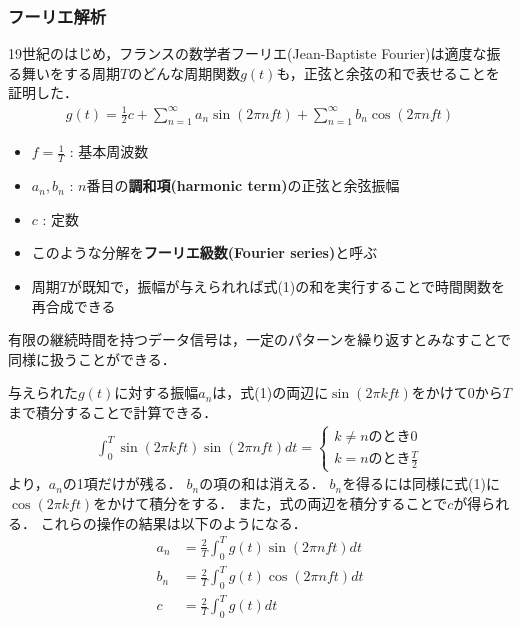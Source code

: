 \documentclass[a4paper]{ltjsarticle}
\begin{document}
		\subsubsection{フーリエ解析}
			19世紀のはじめ，フランスの数学者フーリエ(Jean-Baptiste Fourier)は適度な振る舞いをする周期$T$のどんな周期関数$g(t)$も，正弦と余弦の和で表せることを証明した．
			\begin{align}
				g(t) = \frac{1}{2}c + \sum^{\infty}_{n=1} a_n \sin(2\pi nft) + \sum^{\infty}_{n=1} b_n \cos(2\pi nft)
			\end{align}
			\begin{itemize}
				\item $f=\frac{1}{T}$ : 基本周波数
				\item $a_n,b_n$ : $n$番目の\textbf{調和項(harmonic term)}の正弦と余弦振幅
				\item $c$ : 定数
				\item このような分解を\textbf{フーリエ級数(Fourier series)}と呼ぶ
				\item 周期$T$が既知で，振幅が与えられれば式(1)の和を実行することで時間関数を再合成できる
			\end{itemize}
			有限の継続時間を持つデータ信号は，一定のパターンを繰り返すとみなすことで同様に扱うことができる．\par
			与えられた$g(t)$に対する振幅$a_n$は，式(1)の両辺に$\sin(2\pi kft)$をかけて$0$から$T$まで積分することで計算できる．
			\begin{align}
				\int^T_0 \sin(2\pi kft) \sin(2\pi nft) dt =
				\begin{cases}
					k \neq n \text{のとき} 0 \\
					k = n \text{のとき} \frac{T}{2}
				\end{cases}
			\end{align}
			より，$a_n$の1項だけが残る．
			$b_n$の項の和は消える．
			$b_n$を得るには同様に式(1)に$\cos(2\pi kft)$をかけて積分をする．
			また，式の両辺を積分することで$c$が得られる．
			これらの操作の結果は以下のようになる．
			\begin{align}
				a_n &= \frac{2}{T} \int^T_0 g(t) \sin(2\pi nft)dt \\
				b_n &= \frac{2}{T} \int^T_0 g(t) \cos(2\pi nft)dt \\
				c &= \frac{2}{T} \int^T_0 g(t) dt
			\end{align}
\end{document}
